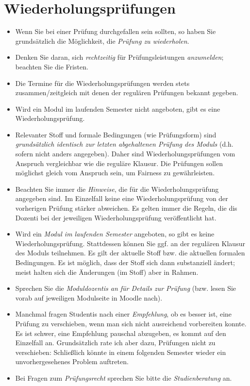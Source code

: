 \documentclass[
  a4paper,
  DIV=11]{scrreprt}
\providecommand{\tightlist}{%
  \setlength{\itemsep}{0pt}\setlength{\parskip}{0pt}}\usepackage{longtable,booktabs,array}
\theoremstyle{definition}
\theoremstyle{remark}
\begin{document}
\hypertarget{wiederholungspruxfcfungen}{%
\section{Wiederholungsprüfungen}\label{wiederholungspruxfcfungen}}

\begin{itemize}
\tightlist
\item
  Wenn Sie bei einer Prüfung durchgefallen sein sollten, so haben Sie
  grundsätzlich die Möglichkeit, die \emph{Prüfung zu wiederholen}.
\item
  Denken Sie daran, sich \emph{rechtzeitig} für Prüfungsleistungen
  \emph{anzumelden}; beachten Sie die Fristen.
\item
  Die Termine für die Wiederholungsprüfungen werden stets
  zusammen/zeitgleich mit denen der regulären Prüfungen bekannt gegeben.
\item
  Wird ein Modul im laufenden Semester nicht angeboten, gibt es eine
  Wiederholungsprüfung.
\item
  Relevanter Stoff und formale Bedingungen (wie Prüfungsform) sind
  \emph{grundsätzlich identisch zur letzten abgehaltenen Prüfung des
  Moduls} (d.h. sofern nicht anders angegeben). Daher sind
  Wiederholungsprüfungen vom Anspruch vergleichbar wie die reguläre
  Klausur. Die Prüfungen sollen möglichst gleich vom Anspruch sein, um
  Fairness zu gewährleisten.
\item
  Beachten Sie immer die \emph{Hinweise}, die für die
  Wiederholungsprüfung angegeben sind. Im Einzelfall keine eine
  Wiederholungsprüfung von der vorherigen Prüfung stärker abweichen. Es
  gelten immer die Regeln, die dis Dozenti bei der jeweiligen
  Wiederholungsprüfung veröffentlicht hat.
\item
  Wird ein \emph{Modul im laufenden Semester} angeboten, so gibt es
  keine Wiederholungsprüfung. Stattdessen können Sie ggf. an der
  regulären Klausur des Moduls teilnehmen. Es gilt der aktuelle Stoff
  bzw. die aktuellen formalen Bedingungen. Es ist möglich, dass der
  Stoff sich dann substanziell ändert; meist halten sich die Änderungen
  (im Stoff) aber in Rahmen.
\item
  Sprechen Sie die \emph{Moduldozentis an für Details zur Prüfung} (bzw.
  lesen Sie vorab auf jeweiligen Modulseite in Moodle nach).
\item
  Manchmal fragen Studentis nach einer \emph{Empfehlung}, ob es besser
  ist, eine Prüfung zu verschieben, wenn man sich nicht ausreichend
  vorbereiten konnte. Es ist schwer, eine Empfehlung pauschal abzugeben,
  es kommt auf den Einzelfall an. Grundsätzlich rate ich aber dazu,
  Prüfungen nicht zu verschieben: Schließlich könnte in einem folgenden
  Semester wieder ein unvorhergesehenes Problem auftreten.
\item
  Bei Fragen zum \emph{Prüfungsrecht} sprechen Sie bitte die
  \emph{Studienberatung} an.
\end{itemize}
\end{document}
